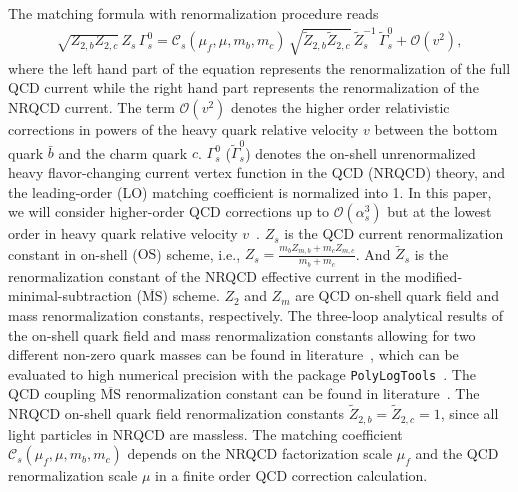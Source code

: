 \documentclass[onecolumn,preprintnumbers,aps,superscriptaddress,nofootinbib,prd,notitlepage]{revtex4-1}
\newcommand{\beq}{\begin{eqnarray}}
\newcommand{\eeq}{\end{eqnarray}}
\begin{document}
The matching formula with renormalization procedure reads
\beq
\label{matchf}
\sqrt{Z_{2,b} Z_{2,c} } \,Z_s  \, \Gamma_s^0 =\mathcal{C}_s(\mu_f,\mu,m_b,m_c) \, \sqrt{\widetilde{Z}_{2,b} \widetilde{Z}_{2,c} } \,
{\widetilde Z}_s^{-1} \, \widetilde{\Gamma}_s^0 + {\mathcal O}(v^2),
\eeq
where  the left hand part of the equation represents the renormalization of the full QCD current while the right hand part represents the renormalization of the NRQCD current.
The term ${\mathcal O}(v^2)$ denotes the higher order relativistic corrections in powers of the heavy quark relative velocity $v$ between the bottom quark  $\bar{b}$ and the charm quark $c$.
 $\Gamma_s^0$ ($\widetilde{\Gamma}_s^0$) denotes the on-shell unrenormalized heavy flavor-changing current vertex function in the QCD (NRQCD) theory, and the leading-order (LO) matching
 coefficient is normalized into 1.
  In this paper, we will consider  higher-order QCD corrections up to ${\mathcal O}(\alpha_s^3)$ but at the lowest order in heavy quark relative velocity $v$~\cite{Marquard:2014pea,Feng:2022vvk}.
 $Z_s$ is the QCD  current renormalization constant in on-shell ($\mathrm{OS}$) scheme, i.e., $Z_s=\frac{m_b Z_{m,b}+m_c Z_{m,c}}{m_b+m_c}$.
 And $\tilde{Z}_s$ is the renormalization constant of the NRQCD effective current  in the modified-minimal-subtraction ($\mathrm{\overline{MS}}$) scheme. $Z_{2}$ and $Z_{m}$ are QCD on-shell quark field and mass renormalization constants, respectively.
 The three-loop analytical results of  the on-shell quark field and mass  renormalization constants  allowing for two different non-zero quark masses  can be found in literature~\cite{Bekavac:2007tk,Marquard:2016dcn,Fael:2020bgs}, which can be  evaluated to high numerical precision  with the package {\texttt{PolyLogTools}}~\cite{Duhr:2019tlz}.
 The QCD    coupling  $\mathrm{\overline{MS}}$   renormalization constant can be found in literature~\cite{Mitov:2006xs,Chetyrkin:1997un,vanRitbergen:1997va}.
 The NRQCD on-shell quark field renormalization constants $\tilde{Z}_{2,b}=\tilde{Z}_{2,c}=1$, since all light particles in NRQCD  are massless. The matching coefficient $\mathcal{C}_s(\mu_f,\mu,m_b,m_c)$ depends on the
 NRQCD factorization scale $\mu_f$ and the QCD  renormalization scale $\mu$ in a finite order QCD correction calculation.
\end{document}
